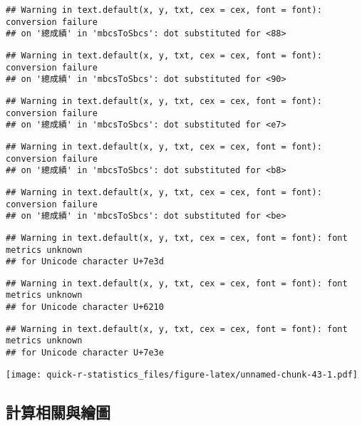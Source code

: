 \documentclass[
]{book}
\begin{document}
\begin{verbatim}
## Warning in text.default(x, y, txt, cex = cex, font = font): conversion failure
## on '總成績' in 'mbcsToSbcs': dot substituted for <88>
\end{verbatim}

\begin{verbatim}
## Warning in text.default(x, y, txt, cex = cex, font = font): conversion failure
## on '總成績' in 'mbcsToSbcs': dot substituted for <90>
\end{verbatim}

\begin{verbatim}
## Warning in text.default(x, y, txt, cex = cex, font = font): conversion failure
## on '總成績' in 'mbcsToSbcs': dot substituted for <e7>
\end{verbatim}

\begin{verbatim}
## Warning in text.default(x, y, txt, cex = cex, font = font): conversion failure
## on '總成績' in 'mbcsToSbcs': dot substituted for <b8>
\end{verbatim}

\begin{verbatim}
## Warning in text.default(x, y, txt, cex = cex, font = font): conversion failure
## on '總成績' in 'mbcsToSbcs': dot substituted for <be>
\end{verbatim}

\begin{verbatim}
## Warning in text.default(x, y, txt, cex = cex, font = font): font metrics unknown
## for Unicode character U+7e3d
\end{verbatim}

\begin{verbatim}
## Warning in text.default(x, y, txt, cex = cex, font = font): font metrics unknown
## for Unicode character U+6210
\end{verbatim}

\begin{verbatim}
## Warning in text.default(x, y, txt, cex = cex, font = font): font metrics unknown
## for Unicode character U+7e3e
\end{verbatim}

\texttt{[image: quick-r-statistics\_files/figure-latex/unnamed-chunk-43-1.pdf]}

\hypertarget{ux8a08ux7b97ux76f8ux95dcux8207ux7e6aux5716}{%
\subsection{計算相關與繪圖}\label{ux8a08ux7b97ux76f8ux95dcux8207ux7e6aux5716}}
\end{document}
